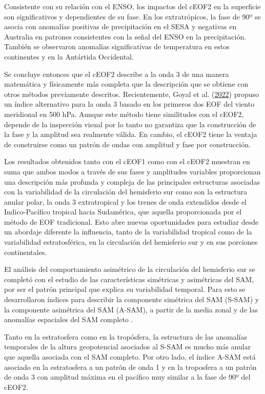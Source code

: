 \documentclass[12pt,oneside,a4paper]{reedthesis}
\begin{document}
Consistente con su relación con el ENSO, los impactos del cEOF2 en la superficie son significativos y dependientes de su fase.
En los extratrópicos, la fase de 90º se asocia con anomalías positivas de precipitación en el SESA y negativas en Australia en patrones consistentes con la señal del ENSO en la precipitación.
También se observaron anomalías significativas de temperatura en estos continentes y en la Antártida Occidental.

Se concluye entonces que el cEOF2 describe a la onda 3 de una manera matemática y físicamente más completa que la descripción que se obtiene con otros métodos previamente descritos.
Recientemente, Goyal et al. (\protect\hyperlink{ref-goyal2022}{2022}) propuso un índice alternativo para la onda 3 basado en los primeros dos EOF del viento meridional en 500 hPa.
Aunque este método tiene similitudes con el cEOF2, depende de la inspección visual por lo tanto no garantiza que la construcción de la fase y la amplitud sea realmente válida.
En cambio, el cEOF2 tiene la ventaja de construirse como un patrón de ondas con amplitud y fase por construcción.

Los resultados obtenidos tanto con el cEOF1 como con el cEOF2 muestran en suma que ambos modos a través de sus fases y amplitudes variables proporcionan una descripción más profunda y compleja de las principales estructuras asociadas con la variabilidad de la circulación del hemisferio sur como son la estructura anular polar, la onda 3 extratropical y los trenes de onda extendidos desde el Indico-Pacífico tropical hacia Sudamérica, que aquella proporcionada por el método de EOF tradicional.
Esto abre nuevas oportunidades para estudiar desde un abordaje diferente la influencia, tanto de la variabilidad tropical como de la variabilidad estratosférica, en la circulación del hemisferio sur y en sus porciones continentales.

El análisis del comportamiento asimétrico de la circulación del hemisferio sur se completó con el estudio de las características simétricas y asimétricas del SAM, por ser el patrón principal que explica su variabilidad temporal.
Para esto se desarrollaron índices para describir la componente simétrica del SAM (S-SAM) y la componente asimétrica del SAM (A-SAM), a partir de la media zonal y de las anomalías espaciales del SAM completo .

Tanto en la estratosfera como en la tropósfera, la estructura de las anomalías temporales de la altura geopotencial asociados al S-SAM es mucho más anular que aquella asociada con el SAM completo.
Por otro lado, el índice A-SAM está asociado en la estratosfera a un patrón de onda 1 y en la troposfera a un patrón de onda 3 con amplitud máxima en el pacífico muy similar a la fase de 90º del cEOF2.
\end{document}
